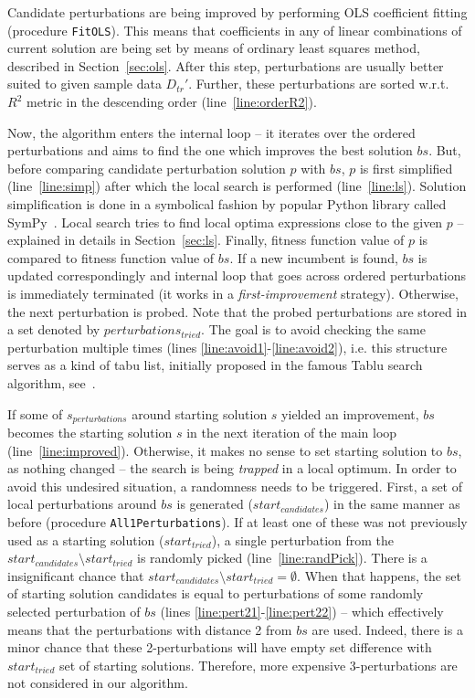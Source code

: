 \documentclass[a4paper,12pt]{elsarticle}
\begin{document}
Candidate perturbations are being improved by performing OLS coefficient fitting (procedure \texttt{FitOLS}). This means that coefficients in any of linear combinations of current solution are being set by means of ordinary least squares method, described in Section~\ref{sec:ols}.   
After this step, perturbations are usually better suited to given sample data $D_{tr}'$. 
Further, these perturbations are sorted w.r.t. $R^2$ metric in the descending order (line~\ref{line:orderR2}). 


Now, the algorithm enters the internal loop -- it iterates over the ordered perturbations and aims to find the one which improves the best solution $bs$. But, before comparing candidate perturbation solution $p$ with $bs$, $p$ is first simplified (line~\ref{line:simp}) after which the local search is performed (line~\ref{line:ls}).
Solution simplification is done in a symbolical fashion by popular Python library called SymPy~\cite{sympy}.
Local search tries to find local optima expressions close to the given $p$ -- explained in details in Section~\ref{sec:ls}.  
Finally, fitness function value of $p$ is compared to fitness function value of $bs$. If a new incumbent is found, $bs$ is updated correspondingly and internal loop that goes across ordered perturbations is immediately terminated (it works in a  \emph{first-improvement} strategy). Otherwise, the next perturbation is probed. 
Note that the probed perturbations are stored in a set denoted by $perturbations_{tried}$. The goal is to avoid checking the same perturbation multiple times (lines \ref{line:avoid1}-\ref{line:avoid2}), i.e. this structure serves as a kind of tabu list, initially proposed in the famous Tablu search algorithm, see~\cite{glover1998tabu}.  


If some of $s_{perturbations}$ around starting solution $s$ yielded an improvement, $bs$ becomes the starting solution $s$ in the next iteration of the main loop (line~\ref{line:improved}). 
Otherwise, it makes no sense to set starting solution to $bs$, as nothing changed -- the search is being  \emph{trapped} in a local optimum. In order to avoid this undesired situation, a randomness needs to be triggered. First, a set of local perturbations around $bs$ is generated ($start_{candidates}$) in the same manner as before (procedure \texttt{All1Perturbations}). If at least one of these was not previously used as a starting solution ($start_{tried}$), a single perturbation from the $start_{candidates} \setminus start_{tried}$ is randomly picked (line~\ref{line:randPick}). There is a insignificant chance that $start_{candidates} \setminus start_{tried} = \emptyset$. When that happens, the set of starting solution candidates is equal to perturbations of some randomly selected perturbation of $bs$ (lines \ref{line:pert21}-\ref{line:pert22}) -- which effectively means that the perturbations with distance 2 from $bs$ are used. Indeed, there is a minor chance that these 2-perturbations will have empty set difference with $start_{tried}$ set of starting solutions. Therefore, more expensive 3-perturbations are not considered in our algorithm. 
\end{document}
